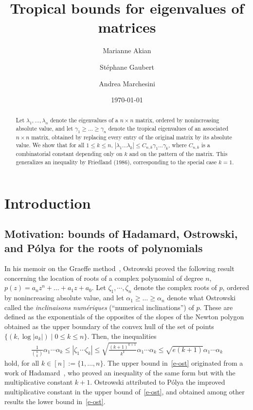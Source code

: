 \documentclass[a4paper]{amsart}
\title{Tropical bounds for eigenvalues of matrices}
\author{Marianne Akian \and St\'ephane Gaubert \and Andrea Marchesini}
\date{\today}
\theoremstyle{definition}
\theoremstyle{plain}
\theoremstyle{remark}
\begin{document}
\begin{abstract}
Let $\lambda_1,\dots,\lambda_n$ denote the eigenvalues of a $n\times n$ matrix,
ordered by nonincreasing absolute value, and let $\gamma_1 {\geqslant} \dots {\geqslant} \gamma_n$ denote the tropical eigenvalues of an associated $n\times n$ matrix, obtained
by replacing every entry of the original matrix by its absolute value.
We show that for all $1{\leqslant} k{\leqslant} n$, $|\lambda_1\dots\lambda_k|
{\leqslant} C_{n,k} \gamma_1\dots\gamma_k$, where $C_{n,k}$ is a
combinatorial constant depending only on $k$ and on the pattern
of the matrix. 
This generalizes an inequality by Friedland (1986), corresponding to the special case $k=1$.
\end{abstract}

\maketitle

\section{Introduction}
\subsection{Motivation: bounds of Hadamard, Ostrowski, and P\'olya for the roots of polynomials}
In his memoir on the Graeffe method~\cite{Ostrowski1}, Ostrowski
proved the following result concerning the location of roots
of a complex polynomial of degree $n$, $p(z) = a_n z^n + \dots + a_1 z + a_0$.
Let  $\zeta_1, \cdots, \zeta_n$ denote the complex roots of $p$,
ordered by 
nonincreasing
absolute value, 
and let $\alpha_1 {\geqslant} \dots {\geqslant} \alpha_n$ denote 
what Ostrowski
called the \emph{inclinaisons num\'eriques} (``numerical inclinations'') of $p$.
These are defined as the exponentials of the opposites of the slopes of the Newton polygon obtained as the upper boundary of the convex hull of the set of points $\{(k,\log |a_k|)\mid 0{\leqslant} k{\leqslant} n\}$. 
Then, the inequalities
\begin{align}
  \frac{1}{\binom{n}{k}} \alpha_1 \dotsm \alpha_k
  {\leqslant} |\zeta_1 \dotsm \zeta_k| {\leqslant} \sqrt{\frac{{(k+1)}^{k+1}}{k^k}} \alpha_1 \dotsm \alpha_k {\leqslant} 
 \sqrt{e (k+1)} \alpha_1 \dotsm \alpha_k
\label{e-ost}
\end{align}
hold, for all $k \in [n]:=\{1,\dots,n\}$.
The upper bound in~\eqref{e-ost} originated from a work of Hadamard~\cite{hadamard1893}, who proved an inequality of the same form but with the multiplicative
constant $k+1$. Ostrowski attributed to P\'olya
the improved multiplicative constant in the upper bound of~\eqref{e-ost}, and obtained among other results the lower bound in~\eqref{e-ost}.
\end{document}
